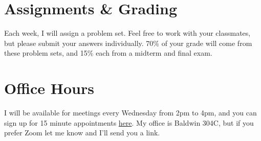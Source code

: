 \documentclass[11pt, letterpaper]{article}
\begin{document}
%
%
%
%

\section*{Assignments \& Grading}

Each week, I will assign a problem set. Feel free to work with your classmates, but please submit your answers individually. 70\% of your grade will come from these problem sets, and 15\% each from a midterm and final exam.

\section*{Office Hours}
I will be available for meetings every Wednesday from 2pm to 4pm, and you can sign up for 15 minute appointments \href{https://calendly.com/jornstein/15min}{here}. My office is Baldwin 304C, but if you prefer Zoom let me know and I'll send you a link.
\end{document}
